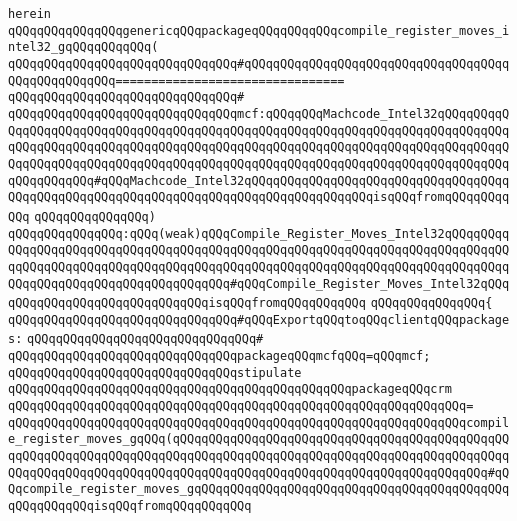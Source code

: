 \verb|herein|\newline
\newline
\verb|qQQqqQQqqQQqqQQqgenericqQQqpackageqQQqqQQqqQQqcompile_register_moves_intel32_gqQQqqQQqqQQq(|\newline
\verb|qQQqqQQqqQQqqQQqqQQqqQQqqQQqqQQq#qQQqqQQqqQQqqQQqqQQqqQQqqQQqqQQqqQQqqQQqqQQqqQQqqQQq================================|\newline
\verb|qQQqqQQqqQQqqQQqqQQqqQQqqQQqqQQq#|\newline
\verb|qQQqqQQqqQQqqQQqqQQqqQQqqQQqqQQqmcf:qQQqqQQqMachcode_Intel32qQQqqQQqqQQqqQQqqQQqqQQqqQQqqQQqqQQqqQQqqQQqqQQqqQQqqQQqqQQqqQQqqQQqqQQqqQQqqQQqqQQqqQQqqQQqqQQqqQQqqQQqqQQqqQQqqQQqqQQqqQQqqQQqqQQqqQQqqQQqqQQqqQQqqQQqqQQqqQQqqQQqqQQqqQQqqQQqqQQqqQQqqQQqqQQqqQQqqQQqqQQqqQQqqQQqqQQqqQQqqQQqqQQqqQQq#qQQqMachcode_Intel32qQQqqQQqqQQqqQQqqQQqqQQqqQQqqQQqqQQqqQQqqQQqqQQqqQQqqQQqqQQqqQQqqQQqqQQqqQQqqQQqqQQqqQQqisqQQqfromqQQqqQQqqQQq|\newline
\verb|qQQqqQQqqQQqqQQq)|\newline
\verb|qQQqqQQqqQQqqQQq:qQQq(weak)qQQqCompile_Register_Moves_Intel32qQQqqQQqqQQqqQQqqQQqqQQqqQQqqQQqqQQqqQQqqQQqqQQqqQQqqQQqqQQqqQQqqQQqqQQqqQQqqQQqqQQqqQQqqQQqqQQqqQQqqQQqqQQqqQQqqQQqqQQqqQQqqQQqqQQqqQQqqQQqqQQqqQQqqQQqqQQqqQQqqQQqqQQqqQQqqQQqqQQq#qQQqCompile_Register_Moves_Intel32qQQqqQQqqQQqqQQqqQQqqQQqqQQqqQQqisqQQqfromqQQqqQQqqQQq|\newline
\verb|qQQqqQQqqQQqqQQq{|\newline
\verb|qQQqqQQqqQQqqQQqqQQqqQQqqQQqqQQq#qQQqExportqQQqtoqQQqclientqQQqpackages:|\newline
\verb|qQQqqQQqqQQqqQQqqQQqqQQqqQQqqQQq#|\newline
\verb|qQQqqQQqqQQqqQQqqQQqqQQqqQQqqQQqpackageqQQqmcfqQQq=qQQqmcf;|\newline
\newline
\verb|qQQqqQQqqQQqqQQqqQQqqQQqqQQqqQQqstipulate|\newline
\verb|qQQqqQQqqQQqqQQqqQQqqQQqqQQqqQQqqQQqqQQqqQQqqQQqpackageqQQqcrm|\newline
\verb|qQQqqQQqqQQqqQQqqQQqqQQqqQQqqQQqqQQqqQQqqQQqqQQqqQQqqQQqqQQqqQQq=|\newline
\verb|qQQqqQQqqQQqqQQqqQQqqQQqqQQqqQQqqQQqqQQqqQQqqQQqqQQqqQQqqQQqqQQqcompile_register_moves_gqQQq(qQQqqQQqqQQqqQQqqQQqqQQqqQQqqQQqqQQqqQQqqQQqqQQqqQQqqQQqqQQqqQQqqQQqqQQqqQQqqQQqqQQqqQQqqQQqqQQqqQQqqQQqqQQqqQQqqQQqqQQqqQQqqQQqqQQqqQQqqQQqqQQqqQQqqQQqqQQqqQQqqQQqqQQqqQQqqQQqqQQqqQQq#qQQqcompile_register_moves_gqQQqqQQqqQQqqQQqqQQqqQQqqQQqqQQqqQQqqQQqqQQqqQQqqQQqqQQqisqQQqfromqQQqqQQqqQQq|\newline
